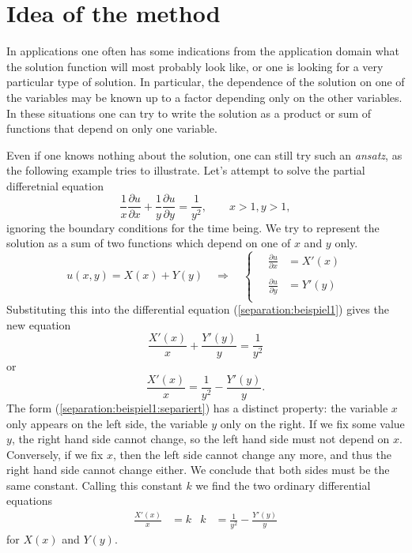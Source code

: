 %
%
%

\section{Idea of the method}
In applications one often has some indications from the application
domain what the solution function will most probably look like, or one
is looking for a very particular type of solution.
In particular, the dependence of the solution on one of the variables may be
known up to a factor depending only on the other variables.
In these situations one can try to write the solution as a product
or sum of functions that depend on only one variable.

Even if one knows nothing about the solution, one can still try such
an {\em ansatz}, as the following example tries to illustrate.
Let's attempt to solve the partial differetnial equation
\begin{equation}
\frac1x
\frac{\partial u}{\partial x}
+
\frac1y
\frac{\partial u}{\partial y}
=\frac1{y^2}
,
\qquad x>1, y>1,
\label{separation:beispiel1}
\end{equation}
ignoring the boundary conditions for the time being.
We try to represent the solution as a sum of two functions which depend
on one of $x$ and $y$ only.
\begin{equation}
u(x,y)=X(x)+Y(y)
\quad\Rightarrow\quad
\begin{cases}
\quad{\displaystyle \frac{\partial u}{\partial x}}&=X'(x)\\
\\
\quad{\displaystyle \frac{\partial u}{\partial y}}&=Y'(y)\\
\end{cases}
\label{separation:beispiel1:ansatz}
\end{equation}
Substituting this into the differential equation
(\ref{separation:beispiel1})
gives the new equation
\[
\frac{X'(x)}{x}+\frac{Y'(y)}{y}=\frac1{y^2}
\]
or
\begin{equation}
\frac{X'(x)}{x}
=\frac1{y^2}
-\frac{Y'(y)}{y}.
\label{separation:beispiel1:separiert}
\end{equation}
The form (\ref{separation:beispiel1:separiert}) has a distinct property:
the variable $x$ only appears on the left side, the variable $y$ only on
the right.
If we fix some value $y$, the right hand side cannot change, so the left
hand side must not depend on $x$.
Conversely, if we fix $x$, then the left side cannot change any more,
and thus the right hand side cannot change either.
We conclude that both sides must be the same constant.
Calling this constant $k$ we find the two ordinary differential equations
\begin{align}
\frac{X'(x)}{x}&=k
&
k&=\frac1{y^2}-\frac{Y'(y)}{y}
\label{separation:beispiel1:separiertedgl}
\end{align}
for $X(x)$ and $Y(y)$.

